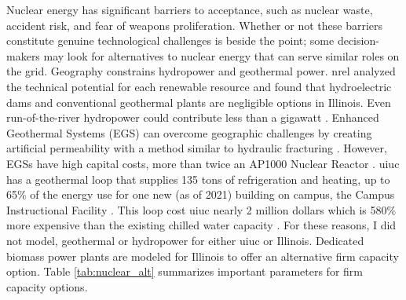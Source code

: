 Nuclear energy has significant barriers to acceptance, such as nuclear waste,
accident risk, and fear of weapons proliferation. Whether or not these barriers
constitute genuine technological challenges is beside the point; some decision-makers
may look for alternatives to nuclear energy that can serve similar roles
on the grid. Geography constrains hydropower and geothermal power. \gls{nrel} analyzed
the technical potential for each renewable resource and found that hydroelectric dams
and conventional geothermal plants are negligible options in Illinois. Even run-of-the-river
hydropower could contribute less than a gigawatt \cite{nrel_2020_2020}. Enhanced Geothermal
Systems (EGS) can overcome geographic challenges by creating artificial permeability
with a method similar to hydraulic fracturing \cite{geothermal_technologies_office_what_2012}.
However, EGSs have high capital costs, more than twice an AP1000 Nuclear Reactor
\cite{nrel_2020_2020}. \gls{uiuc} has a geothermal loop that supplies 135 tons of refrigeration
and heating, up to 65\% of the energy use for one new (as of 2021) building on campus,
the Campus Instructional Facility \cite{noauthor_geothermal_nodate}.
This loop cost \gls{uiuc} nearly 2 million dollars which is 580\% more expensive
than the existing chilled water capacity
\cite{noauthor_geothermal_nodate,affiliated_engineers_inc_utilities_2015}. For these
reasons, I did not model, geothermal or hydropower for either \gls{uiuc} or Illinois.
Dedicated biomass power plants are modeled for Illinois to offer an alternative
firm capacity option. Table \ref{tab:nuclear_alt} summarizes important parameters
for firm capacity options.

\begin{table}[H]
  \centering
  \caption{Summary of Firm Capacity Options}
  \label{tab:nuclear_alt}
\end{table}
